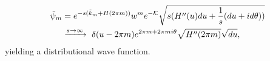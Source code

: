\documentclass[notas.tex]{subfiles}
\begin{document}
\begin{align*} \label{eq_cyl_limit}
	\tilde \psi_m &= e^{-s(\tilde k_m + H(2 \pi m))}w^m e^{-\mathcal{K}} \sqrt{s(H''(u)du+\frac{1}{s}(du + i d\theta))} \\
	&\xrightarrow{s\to\infty} ~ \delta(u-2\pi m) e^{2 \pi m + 2 \pi m i \theta} \sqrt{H''(2\pi m)}\sqrt{du}, \nonumber
\end{align*}
yielding a distributional wave function.


\end{document}
